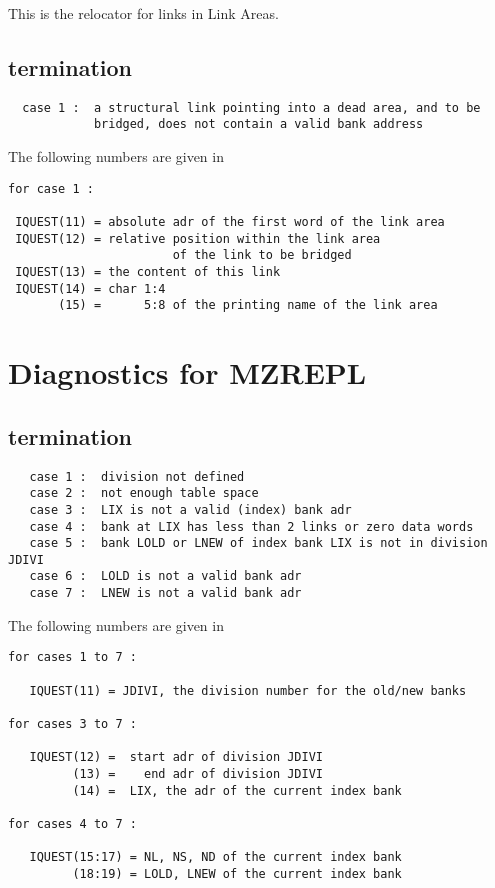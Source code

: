 This is the relocator for links in Link Areas.

\subsection*{ termination}

\begin{verbatim}
  case 1 :  a structural link pointing into a dead area, and to be
            bridged, does not contain a valid bank address
\end{verbatim}

The following numbers are given in 

\begin{verbatim}
for case 1 :

 IQUEST(11) = absolute adr of the first word of the link area
 IQUEST(12) = relative position within the link area
                       of the link to be bridged
 IQUEST(13) = the content of this link
 IQUEST(14) = char 1:4
       (15) =      5:8 of the printing name of the link area
\end{verbatim}

\section{Diagnostics for MZREPL}


\subsection*{ termination}

\begin{verbatim}
   case 1 :  division not defined
   case 2 :  not enough table space
   case 3 :  LIX is not a valid (index) bank adr
   case 4 :  bank at LIX has less than 2 links or zero data words
   case 5 :  bank LOLD or LNEW of index bank LIX is not in division JDIVI
   case 6 :  LOLD is not a valid bank adr
   case 7 :  LNEW is not a valid bank adr
\end{verbatim}

The following numbers are given in 

\begin{verbatim}
for cases 1 to 7 :

   IQUEST(11) = JDIVI, the division number for the old/new banks

for cases 3 to 7 :

   IQUEST(12) =  start adr of division JDIVI
         (13) =    end adr of division JDIVI
         (14) =  LIX, the adr of the current index bank

for cases 4 to 7 :

   IQUEST(15:17) = NL, NS, ND of the current index bank
         (18:19) = LOLD, LNEW of the current index bank
\end{verbatim}

